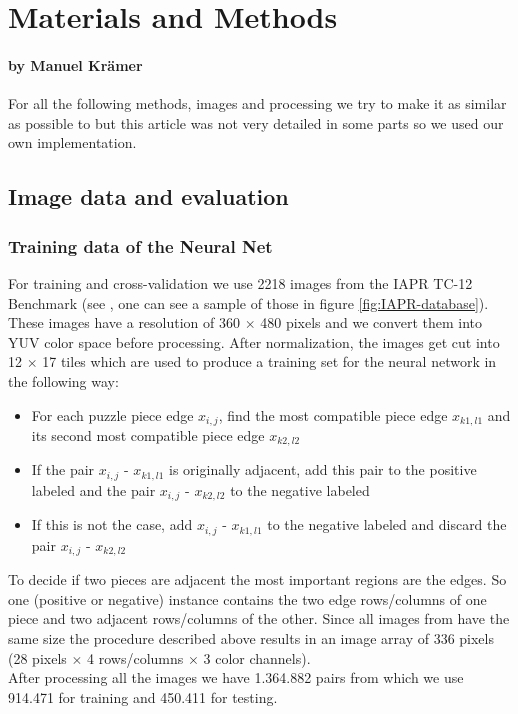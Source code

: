 \documentclass[11pt]{report}
\begin{document}
\chapter{Materials and Methods}
\subsubsection*{by Manuel Krämer}

For all the following methods, images and processing we try to make it as similar as possible to \cite{sholomon2016dnn} but this article was not very detailed in some parts so we used our own implementation.

\section{Image data and evaluation}
\subsection{Training data of the Neural Net}
For training and cross-validation we use 2218 images from the IAPR TC-12 Benchmark (see \cite{grubinger06}, one can see a sample of those in figure \ref{fig:IAPR-database}). These images have a resolution of 360 $\times$ 480 pixels and we convert them into YUV color space before processing. After normalization, the images get cut into 12 $\times$ 17 tiles which are used to produce a training set for the neural network in the following way:
\begin{itemize}
	\item For each puzzle piece edge $x_{i,j}$, find the most compatible piece edge $x_{k1,l1}$ and its second most compatible piece edge $x_{k2,l2}$
	\item  If the pair $x_{i,j}$ - $x_{k1,l1}$ is originally adjacent, add this pair to the positive labeled and the pair $x_{i,j}$ - $x_{k2,l2}$ to the negative labeled
	\item If this is not the case, add $x_{i,j}$ - $x_{k1,l1}$ to the negative labeled and discard the pair $x_{i,j}$ - $x_{k2,l2}$
\end{itemize}
To decide if two pieces are adjacent the most important regions are the edges. So one (positive or negative) instance contains the two edge rows/columns of one piece and two adjacent rows/columns of the other. Since all images from \cite{grubinger06} have the same size the procedure described above results in an image array of 336 pixels (28 pixels $\times$ 4 rows/columns $\times$ 3 color channels). \\
After processing all the images we have 1.364.882 pairs from which we use 914.471 for training and 450.411 for testing.
\end{document}
